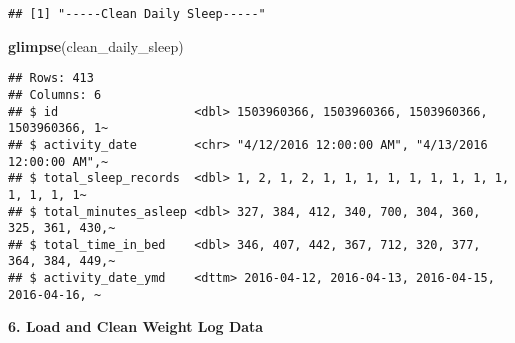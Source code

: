 \documentclass[
]{article}
\newenvironment{Shaded}{\begin{snugshade}}{\end{snugshade}}
\newcommand{\AttributeTok}[1]{\textcolor[rgb]{0.13,0.29,0.53}{#1}}
\newcommand{\CommentTok}[1]{\textcolor[rgb]{0.56,0.35,0.01}{\textit{#1}}}
\newcommand{\FunctionTok}[1]{\textcolor[rgb]{0.13,0.29,0.53}{\textbf{#1}}}
\newcommand{\NormalTok}[1]{#1}
\newcommand{\OtherTok}[1]{\textcolor[rgb]{0.56,0.35,0.01}{#1}}
\newcommand{\SpecialCharTok}[1]{\textcolor[rgb]{0.81,0.36,0.00}{\textbf{#1}}}
\newcommand{\StringTok}[1]{\textcolor[rgb]{0.31,0.60,0.02}{#1}}
\begin{document}
\begin{Shaded}
\end{Shaded}

\begin{verbatim}
## [1] "-----Clean Daily Sleep-----"
\end{verbatim}

\begin{Shaded}
\begin{Highlighting}[]
\FunctionTok{glimpse}\NormalTok{(clean\_daily\_sleep)}
\end{Highlighting}
\end{Shaded}

\begin{verbatim}
## Rows: 413
## Columns: 6
## $ id                   <dbl> 1503960366, 1503960366, 1503960366, 1503960366, 1~
## $ activity_date        <chr> "4/12/2016 12:00:00 AM", "4/13/2016 12:00:00 AM",~
## $ total_sleep_records  <dbl> 1, 2, 1, 2, 1, 1, 1, 1, 1, 1, 1, 1, 1, 1, 1, 1, 1~
## $ total_minutes_asleep <dbl> 327, 384, 412, 340, 700, 304, 360, 325, 361, 430,~
## $ total_time_in_bed    <dbl> 346, 407, 442, 367, 712, 320, 377, 364, 384, 449,~
## $ activity_date_ymd    <dttm> 2016-04-12, 2016-04-13, 2016-04-15, 2016-04-16, ~
\end{verbatim}

\textbf{6. Load and Clean Weight Log Data}
\end{document}
